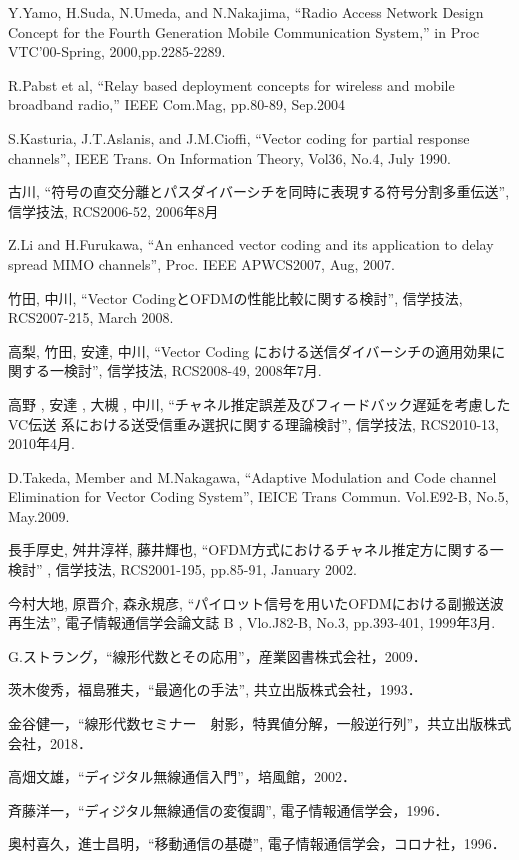 \begin{thebibliography}{99}
     Y.Yamo, H.Suda, N.Umeda, and N.Nakajima,
    ``Radio Access Network Design Concept for the Fourth Generation Mobile
    Communication System,'' in Proc VTC'00-Spring, 2000,pp.2285-2289.

     R.Pabst et al, 
    “Relay based deployment concepts for wireless and mobile broadband radio,” IEEE
    Com.Mag, pp.80-89, Sep.2004

     S.Kasturia, J.T.Aslanis, and J.M.Cioffi, ``Vector coding for partial
    response channels'', IEEE Trans. On Information Theory, Vol36, No.4, July 1990.

     古川, ``符号の直交分離とパスダイバーシチを同時に表現する符号分割多重伝送'',
    信学技法, RCS2006-52, 2006年8月

     Z.Li and H.Furukawa, ``An enhanced vector coding and its application to delay
    spread MIMO channels'', Proc. IEEE APWCS2007, Aug, 2007.

     竹田, 中川, ``Vector CodingとOFDMの性能比較に関する検討'', 信学技法,
    RCS2007-215, March 2008.

     高梨, 竹田, 安達, 中川, ``Vector Coding における送信ダイバーシチの適用効果に
    関する一検討'', 信学技法, RCS2008-49, 2008年7月.

     高野 , 安達 , 大槻 , 中川, ``チャネル推定誤差及びフィードバック遅延を考慮したVC伝送
    系における送受信重み選択に関する理論検討'', 信学技法, RCS2010-13, 2010年4月.

     D.Takeda, Member and M.Nakagawa, ``Adaptive Modulation and Code channel
    Elimination for Vector Coding System'', IEICE Trans Commun. Vol.E92-B, No.5, May.2009.

     長手厚史, 舛井淳祥, 藤井輝也, ``OFDM方式におけるチャネル推定方に関する一検討''
    , 信学技法, RCS2001-195, pp.85-91, January 2002.

     今村大地, 原晋介, 森永規彦, ``パイロット信号を用いたOFDMにおける副搬送波再生法'',
     電子情報通信学会論文誌 B , Vlo.J82-B, No.3, pp.393-401, 1999年3月.

     G.ストラング，``線形代数とその応用''，産業図書株式会社，2009．

     茨木俊秀，福島雅夫，``最適化の手法'', 共立出版株式会社，1993．

     金谷健一，``線形代数セミナー　射影，特異値分解，一般逆行列''，共立出版株式会社，2018．

     高畑文雄，``ディジタル無線通信入門''，培風館，2002．

     斉藤洋一，``ディジタル無線通信の変復調'', 電子情報通信学会，1996．

     奥村喜久，進士昌明，``移動通信の基礎'', 電子情報通信学会，コロナ社，1996．

\end{thebibliography}
